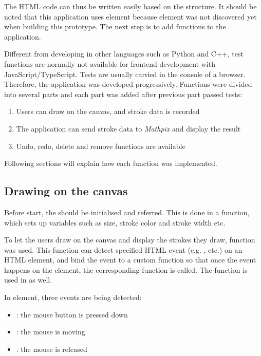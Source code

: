 \documentclass[12pt,twoside]{report}
\begin{document}
The HTML code can thus be written easily based on the structure. It should be
noted that this application uses  element because 
element was not discovered yet when building this prototype. The next step is to
add functions to the application. 

Different from developing in other languages such as Python and C++, test
functions are normally not available for frontend development with
JavaScript/TypeScript. Tests are usually carried in the console of a browser. Therefore, the application was developed progressively. Functions were divided into several parts and each part was added after previous part passed tests:
\begin{enumerate}
    \item Users can draw on the canvas, and stroke data is recorded
    \item The application can send stroke data to \textit{Mathpix} and display the result
    \item Undo, redo, delete and remove functions are available
\end{enumerate}

Following sections will explain how each function was implemented.

\subsection{Drawing on the canvas}
Before start, the  should be initialised and referred. This is done in a  function, which sets up variables such as size, stroke color and stroke width etc.

To let the users draw on the canvas and display the strokes they draw, function
 was used. This function can detect specified HTML event
(e.g. ,  etc.) on an HTML element, and bind the
event to a custom function so that once the event happens on the element, the
corresponding function is called. The function is used in  as well.

In  element, three events are being detected: 
\begin{itemize}
    \item {}: the mouse button is pressed down
    \item {}: the mouse is moving
    \item {}: the mouse is released
\end{itemize}
\end{document}
